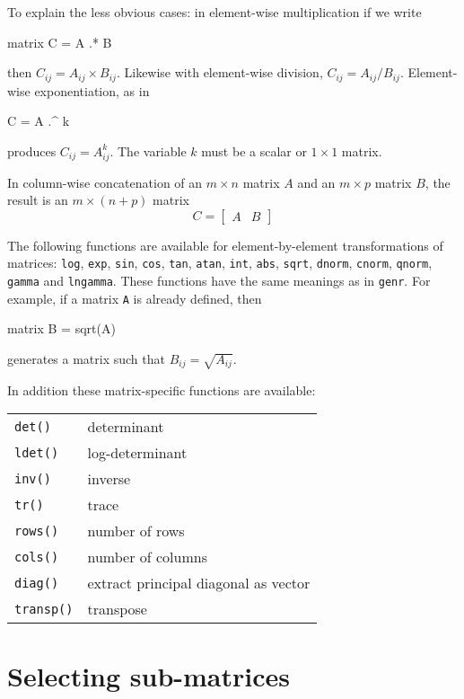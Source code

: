 To explain the less obvious cases: in element-wise multiplication if
we write 
%
\begin{code}
matrix C = A .* B
\end{code}
% 
then $C_{ij} = A_{ij} \times B_{ij}$.  Likewise with element-wise
division, $C_{ij} = A_{ij}/B_{ij}$. Element-wise exponentiation, as in
%
\begin{code}
C = A .^ k
\end{code}
% 
produces $C_{ij} = A_{ij}^k$.  The variable $k$ must be a scalar or
$1\times 1$ matrix.

In column-wise concatenation of an $m\times n$ matrix $A$ and
an $m\times p$ matrix $B$, the result is an $m\times (n+p)$ matrix
%
\[
C = \left[ \begin{array}{cc} A & B \end{array} \right]
\]
%

The following functions are available for element-by-element
transformations of matrices: \texttt{log}, \texttt{exp}, \texttt{sin},
\texttt{cos}, \texttt{tan}, \texttt{atan}, \texttt{int}, \texttt{abs},
\texttt{sqrt}, \texttt{dnorm}, \texttt{cnorm}, \texttt{qnorm},
\texttt{gamma} and \texttt{lngamma}.  These functions have the same
meanings as in \texttt{genr}.  For example, if a matrix \texttt{A} is
already defined, then
%
\begin{code}
matrix B = sqrt(A)
\end{code}
%
generates a matrix such that $B_{ij} = \sqrt{A_{ij}}$.

In addition these matrix-specific functions are available:

\begin{center}
\begin{tabular}{ll}
\texttt{det()} & determinant \\
\texttt{ldet()} & log-determinant \\
\texttt{inv()} & inverse \\
\texttt{tr()} & trace \\
\texttt{rows()} & number of rows \\
\texttt{cols()} & number of columns \\
\texttt{diag()} & extract principal diagonal as vector \\
\texttt{transp()} & transpose 
\end{tabular}
\end{center}

\section{Selecting sub-matrices}
\label{matrix-sub}


